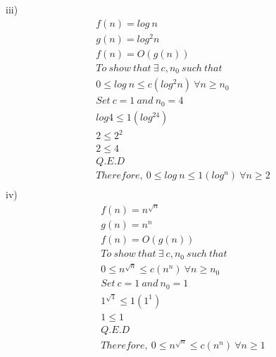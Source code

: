 \documentclass{article}
\begin{document}
iii)
\begin{align*}
f(n) = log~{}n \\
g(n) = log^2n \\
f(n) = O(g(n)) \\
To~{} show~{} that~{} \exists~{} c,n_0~{}	such~{} that~{}\\
0 \leq log~{}n \leq c(log^2n)~{} \forall n\geq n_0\\ 
Set~{} c=1~{} and~{} n_0 = 4 \\
log4 \leq 1(log^24) \\
2\leq 2^2 \\
2\leq 4 \\
Q.E.D  \\
Therefore,~{} 0 \leq log~{}n \leq 1(log^n)~{} \forall n\geq 2\\
\end{align*}
iv)
\begin{align*}
f(n) = n^\sqrt{n} \\
g(n) = n^n \\
f(n) = O(g(n)) \\
To~{} show~{} that~{} \exists~{} c,n_0~{}	such~{} that~{}\\
0 \leq n^{\sqrt{n}} \leq c(n^n)~{} \forall n\geq n_0\\ 
Set~{} c=1~{} and~{} n_0 = 1 \\
1^{\sqrt{1}} \leq 1(1^1) \\
1\leq 1 \\
Q.E.D  \\
Therefore,~{} 0 \leq n^{\sqrt{n}} \leq c(n^n)~{} \forall n\geq 1\\
\end{align*}
\end{document}
